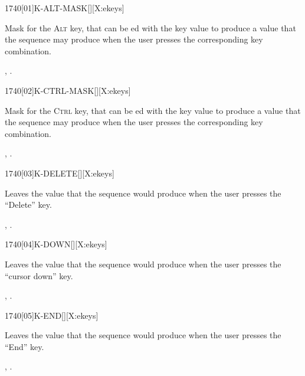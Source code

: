 
\begin{worddef}{1740}[01]{K-ALT-MASK}[][X:ekeys]
\item {}

	Mask for the \textsc{Alt} key, that can be ed with the
	key value to produce a value that the sequence 
	 may produce when the user presses the
	corresponding key combination.

\see {},
	.
\end{worddef}


\begin{worddef}{1740}[02]{K-CTRL-MASK}[][X:ekeys]
\item {}

	Mask for the \textsc{Ctrl} key, that can be ed with the
	key value to produce a value that the sequence 
	 may produce when the user presses the
	corresponding key combination.

\see {},
	.
\end{worddef}


\begin{worddef}{1740}[03]{K-DELETE}[][X:ekeys]
\item {}

	Leaves the value  that the sequence 
	 would produce when the user presses the
	``Delete'' key.

\see {},
	.
\end{worddef}


\begin{worddef}{1740}[04]{K-DOWN}[][X:ekeys]
\item {}

	Leaves the value  that the sequence 
	 would produce when the user presses the
	``cursor down'' key.

\see {},
	.
\end{worddef}


\begin{worddef}{1740}[05]{K-END}[][X:ekeys]
\item {}

	Leaves the value  that the sequence 
	 would produce when the user presses the
	``End'' key.

\see {},
	.
\end{worddef}


